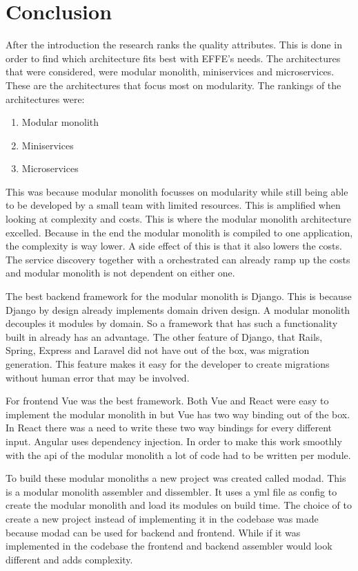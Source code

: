 \chapter{Conclusion}

After the introduction the research ranks the quality attributes. This is done in order to find which architecture fits best with EFFE's needs. The architectures that were considered, were modular monolith, miniservices and microservices. These are the architectures that focus most on modularity. The rankings of the architectures were:
\begin{enumerate}
  \item Modular monolith
  \item Miniservices
  \item Microservices
\end{enumerate}

This was because modular monolith focusses on modularity while still being able to be developed by a small team with limited resources. This is amplified when looking at complexity and costs. This is where the modular monolith architecture excelled. Because in the end the modular monolith is compiled to one application, the complexity is way lower. A side effect of this is that it also lowers the costs. The service discovery together with a orchestrated can already ramp up the costs and modular monolith is not dependent on either one.

The best backend framework for the modular monolith is Django. This is because Django by design already implements domain driven design. A modular monolith decouples it modules by domain. So a framework that has such a functionality built in already has an advantage. The other feature of Django, that Rails, Spring, Express and Laravel did not have out of the box, was migration generation. This feature makes it easy for the developer to create migrations without human error that may be involved.

For frontend Vue was the best framework. Both Vue and React were easy to implement the modular monolith in but Vue has two way binding out of the box. In React there was a need to write these two way bindings for every different input. Angular uses dependency injection. In order to make this work smoothly with the api of the modular monolith a lot of code had to be written per module.

To build these modular monoliths a new project was created called modad. This is a modular monolith assembler and dissembler. It uses a yml file as config to create the modular monolith and load its modules on build time. The choice of to create a new project instead of implementing it in the codebase was made because modad can be used for backend and frontend. While if it was implemented in the codebase the frontend and backend assembler would look different and adds complexity.
